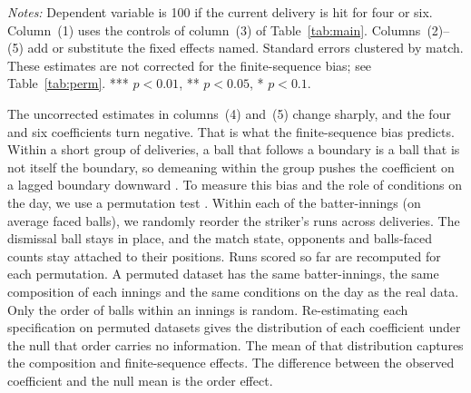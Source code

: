 \documentclass[11pt]{article}
\begin{document}
\begin{table}[tbp]
\centering
\begin{threeparttable}
\caption{Boundary on the current ball: tightening the fixed effects}\label{tab:fe}
\footnotesize
\setlength{\tabcolsep}{4pt}

\begin{tablenotes}[flushleft]\footnotesize
\item \emph{Notes:} Dependent variable is 100 if the current delivery is hit for four or six. Column~(1) uses the controls of column~(3) of Table~\ref{tab:main}. Columns~(2)--(5) add or substitute the fixed effects named. Standard errors clustered by match. These estimates are not corrected for the finite-sequence bias; see Table~\ref{tab:perm}. *** $p<0.01$, ** $p<0.05$, * $p<0.1$.
\end{tablenotes}
\end{threeparttable}
\end{table}

The uncorrected estimates in columns~(4) and~(5) change sharply, and the four and six coefficients turn negative. That is what the finite-sequence bias predicts. Within a short group of deliveries, a ball that follows a boundary is a ball that is not itself the boundary, so demeaning within the group pushes the coefficient on a lagged boundary downward \citep{nickell1981biases,miller2018surprised}. To measure this bias and the role of conditions on the day, we use a permutation test \citep{young2019channeling}. Within each of the \BatterInnings{} batter-innings (on average \BatterInningsMeanBalls{} faced balls), we randomly reorder the striker's runs across deliveries. The dismissal ball stays in place, and the match state, opponents and balls-faced counts stay attached to their positions. Runs scored so far are recomputed for each permutation. A permuted dataset has the same batter-innings, the same composition of each innings and the same conditions on the day as the real data. Only the order of balls within an innings is random. Re-estimating each specification on \PermR{} permuted datasets gives the distribution of each coefficient under the null that order carries no information. The mean of that distribution captures the composition and finite-sequence effects. The difference between the observed coefficient and the null mean is the order effect.
\end{document}
